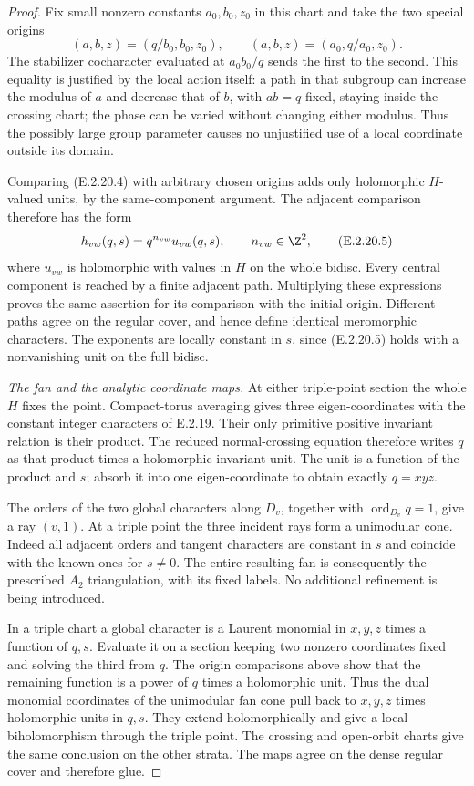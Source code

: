 \begin{proof}
Fix small nonzero constants
$a_0,b_0,z_0$ in this chart
and take the two special
origins
\[
 (a,b,z)=(q/b_0,b_0,z_0),\qquad
 (a,b,z)=(a_0,q/a_0,z_0).
 \tag{E.2.20.4}
\]
The stabilizer cocharacter
evaluated at $a_0b_0/q$
sends the first to the
second.  This equality
is justified by the local
action itself: a path
in that subgroup can
increase the modulus of
$a$ and decrease that
of $b$, with $ab=q$
fixed, staying inside
the crossing chart;
the phase can be varied
without changing either
modulus.  Thus the
possibly large group
parameter causes no
unjustified use of a
local coordinate outside
its domain.

Comparing (E.2.20.4) with
arbitrary chosen origins
adds only holomorphic
$H$-valued units, by the
same-component argument.
The adjacent comparison
therefore has the form
\[
 h_{vw}(q,s)=q^{n_{vw}}u_{vw}(q,s),
 \qquad n_{vw}\in\Z^2,
 \tag{E.2.20.5}
\]
where $u_{vw}$ is holomorphic
with values in $H$ on the
whole bidisc.  Every central
component is reached by
a finite adjacent path.
Multiplying these expressions
proves the same assertion
for its comparison with
the initial origin.
Different paths agree
on the regular cover,
and hence define identical
meromorphic characters.
The exponents are locally
constant in $s$, since
(E.2.20.5) holds with a
nonvanishing unit on the
full bidisc.

\emph{The fan and the analytic coordinate maps.}
At either triple-point
section the whole $H$
fixes the point.
Compact-torus averaging
gives three eigen-coordinates
with the constant integer
characters of E.2.19.
Their only primitive
positive invariant relation
is their product.
The reduced normal-crossing
equation therefore writes
$q$ as that product times
a holomorphic invariant
unit.  The unit is a
function of the product
and $s$; absorb it into
one eigen-coordinate to
obtain exactly $q=xyz$.

The orders of the two
global characters along
$D_v$, together with
$\operatorname{ord}_{D_v}q=1$,
give a ray $(v,1)$.
At a triple point the
three incident rays
form a unimodular cone.
Indeed all adjacent
orders and tangent
characters are constant
in $s$ and coincide
with the known ones
for $s\ne0$.
The entire resulting
fan is consequently
the prescribed $A_2$
triangulation, with
its fixed labels.
No additional refinement
is being introduced.

In a triple chart a
global character is
a Laurent monomial in
$x,y,z$ times a function
of $q,s$.  Evaluate it
on a section keeping
two nonzero coordinates
fixed and solving the
third from $q$.
The origin comparisons
above show that the
remaining function is
a power of $q$ times
a holomorphic unit.
Thus the dual monomial
coordinates of the
unimodular fan cone
pull back to $x,y,z$
times holomorphic units
in $q,s$.  They extend
holomorphically and
give a local
biholomorphism through
the triple point.
The crossing and
open-orbit charts give
the same conclusion
on the other strata.
The maps agree on
the dense regular
cover and therefore
glue.


\end{proof}
